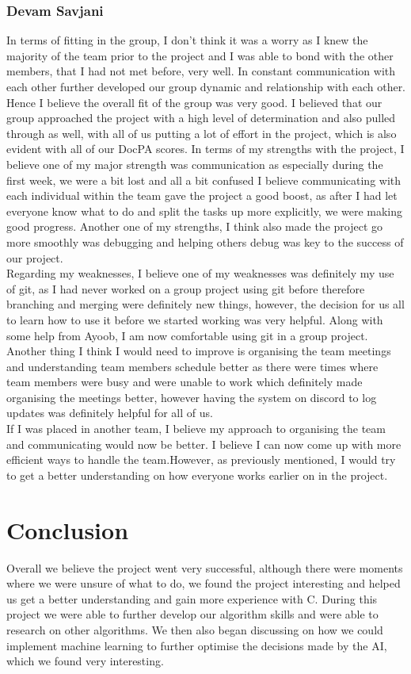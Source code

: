 \documentclass[10pt]{article}
\begin{document}
\subsubsection{Devam Savjani}
In terms of fitting in the group, I don’t think it was a worry as I knew the majority of the team prior to the project and I was able to bond with the other members, that I had not met before, very well. In constant communication with each other further developed our group dynamic and relationship with each other. Hence I believe the overall fit of the group was very good. I believed that our group approached the project with a high level of determination and also pulled through as well, with all of us putting a lot of effort in the project, which is also evident with all of our DocPA scores.
In terms of my strengths with the project, I believe one of my major strength was communication as especially during the first week, we were a bit lost and all a bit confused I believe communicating with each individual within the team gave the project a good boost, as after I had let everyone know what to do and split the tasks up more explicitly, we were making good progress. Another one of my strengths, I think also made the project go more smoothly was debugging and helping others debug was key to the success of our project.
\\Regarding my weaknesses, I believe one of my weaknesses was definitely my use of git, as I had never worked on a group project using git before therefore branching and merging were definitely new things, however, the decision for us all to learn how to use it before we started working was very helpful. Along with some help from Ayoob, I am now comfortable using git in a group project.
\\Another thing I think I would need to improve is organising the team meetings and understanding team members schedule better as there were times where team members were busy and were unable to work which definitely made organising the meetings better, however having the system on discord to log updates was definitely helpful for all of us.
\\If I was placed in another team, I believe my approach to organising the team and communicating would now be better. I believe I can now come up with  more efficient ways to handle the team.However, as previously mentioned, I would try to get a better understanding on how everyone works earlier on in the project.
\section{Conclusion}
Overall we believe the project went very successful, although there were moments where we were unsure of what to do, we found the project interesting and helped us get a better understanding and gain more experience with C. During this project we were able to further develop our algorithm skills and were able to research on other algorithms. We then also began discussing on how we could implement machine learning to further optimise the decisions made by the AI, which we found very interesting.
\end{document}
